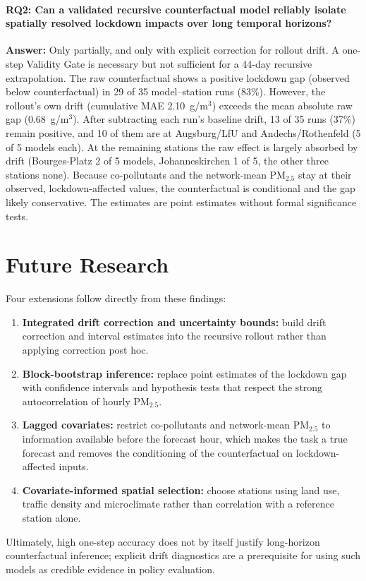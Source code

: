 \paragraph{RQ2: Can a validated recursive counterfactual model reliably isolate spatially resolved lockdown impacts over long temporal horizons?}
\textbf{Answer:} Only partially, and only with explicit correction for rollout drift. A one-step Validity Gate is necessary but not sufficient for a 44-day recursive extrapolation. The raw counterfactual shows a positive lockdown gap (observed below counterfactual) in 29 of 35 model--station runs (83\%). However, the rollout's own drift (cumulative MAE 2.10~\textmu g/m$^3$) exceeds the mean absolute raw gap (0.68~\textmu g/m$^3$). After subtracting each run's baseline drift, 13 of 35 runs (37\%) remain positive, and 10 of them are at Augsburg/LfU and Andechs/Rothenfeld (5 of 5 models each). At the remaining stations the raw effect is largely absorbed by drift (Bourges-Platz 2 of 5 models, Johanneskirchen 1 of 5, the other three stations none). Because co-pollutants and the network-mean PM$_{2.5}$ stay at their observed, lockdown-affected values, the counterfactual is conditional and the gap likely conservative. The estimates are point estimates without formal significance tests.

\section{Future Research}
\label{section:conclusion-future}

Four extensions follow directly from these findings:

\begin{enumerate}
    \item \textbf{Integrated drift correction and uncertainty bounds:} build drift correction and interval estimates into the recursive rollout rather than applying correction post hoc.
    \item \textbf{Block-bootstrap inference:} replace point estimates of the lockdown gap with confidence intervals and hypothesis tests that respect the strong autocorrelation of hourly PM$_{2.5}$.
    \item \textbf{Lagged covariates:} restrict co-pollutants and network-mean PM$_{2.5}$ to information available before the forecast hour, which makes the task a true forecast and removes the conditioning of the counterfactual on lockdown-affected inputs.
    \item \textbf{Covariate-informed spatial selection:} choose stations using land use, traffic density and microclimate rather than correlation with a reference station alone.
\end{enumerate}

Ultimately, high one-step accuracy does not by itself justify long-horizon counterfactual inference; explicit drift diagnostics are a prerequisite for using such models as credible evidence in policy evaluation.

